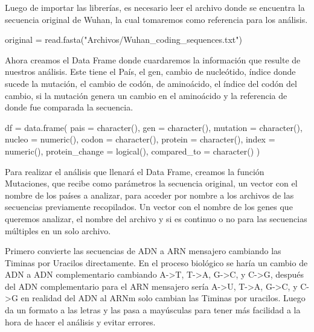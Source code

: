 \documentclass[
  12pt,
]{article}
\newenvironment{Shaded}{\begin{snugshade}}{\end{snugshade}}
\newcommand{\AttributeTok}[1]{\textcolor[rgb]{0.77,0.63,0.00}{#1}}
\newcommand{\FunctionTok}[1]{\textcolor[rgb]{0.00,0.00,0.00}{#1}}
\newcommand{\NormalTok}[1]{#1}
\newcommand{\OtherTok}[1]{\textcolor[rgb]{0.56,0.35,0.01}{#1}}
\newcommand{\StringTok}[1]{\textcolor[rgb]{0.31,0.60,0.02}{#1}}
\begin{document}
Luego de importar las librerías, es necesario leer el archivo donde se
encuentra la secuencia original de Wuhan, la cual tomaremos como
referencia para los análisis.

\begin{Shaded}
\begin{Highlighting}[]
\NormalTok{original }\OtherTok{=} \FunctionTok{read.fasta}\NormalTok{(}\StringTok{"Archivos/Wuhan\_coding\_sequences.txt"}\NormalTok{)}
\end{Highlighting}
\end{Shaded}

Ahora creamos el Data Frame donde cuardaremos la información que resulte
de nuestros análisis. Este tiene el País, el gen, cambio de nucleótido,
índice donde sucede la mutación, el cambio de codón, de aminoácido, el
índice del codón del cambio, si la mutación genera un cambio en el
aminoácido y la referencia de donde fue comparada la secuencia.

\begin{Shaded}
\begin{Highlighting}[]
\NormalTok{df }\OtherTok{=} \FunctionTok{data.frame}\NormalTok{(}
  \AttributeTok{pais =} \FunctionTok{character}\NormalTok{(),}
  \AttributeTok{gen =} \FunctionTok{character}\NormalTok{(),}
  \AttributeTok{mutation =} \FunctionTok{character}\NormalTok{(),}
  \AttributeTok{nucleo =} \FunctionTok{numeric}\NormalTok{(),}
  \AttributeTok{codon =} \FunctionTok{character}\NormalTok{(),}
  \AttributeTok{protein =} \FunctionTok{character}\NormalTok{(),}
  \AttributeTok{index =} \FunctionTok{numeric}\NormalTok{(),}
  \AttributeTok{protein\_change =} \FunctionTok{logical}\NormalTok{(),}
  \AttributeTok{compared\_to =} \FunctionTok{character}\NormalTok{()}
\NormalTok{)}
\end{Highlighting}
\end{Shaded}

Para realizar el análisis que llenará el Data Frame, creamos la función
Mutaciones, que recibe como parámetros la secuencia original, un vector
con el nombre de los países a analizar, para acceder por nombre a los
archivos de las secuencias previamente recopilados. Un vector con el
nombre de los genes que queremos analizar, el nombre del archivo y si es
continuo o no para las secuencias múltiples en un solo archivo.

Primero convierte las secuencias de ADN a ARN mensajero cambiando las
Timinas por Uracilos directamente. En el proceso biológico se haría un
cambio de ADN a ADN complementario cambiando A-\textgreater T,
T-\textgreater A, G-\textgreater C, y C-\textgreater G, después del ADN
complementario para el ARN mensajero sería A-\textgreater U,
T-\textgreater A, G-\textgreater C, y C-\textgreater G en realidad del
ADN al ARNm solo cambian las Timinas por uracilos. Luego da un formato a
las letras y las pasa a mayúsculas para tener más facilidad a la hora de
hacer el análisis y evitar errores.
\end{document}
